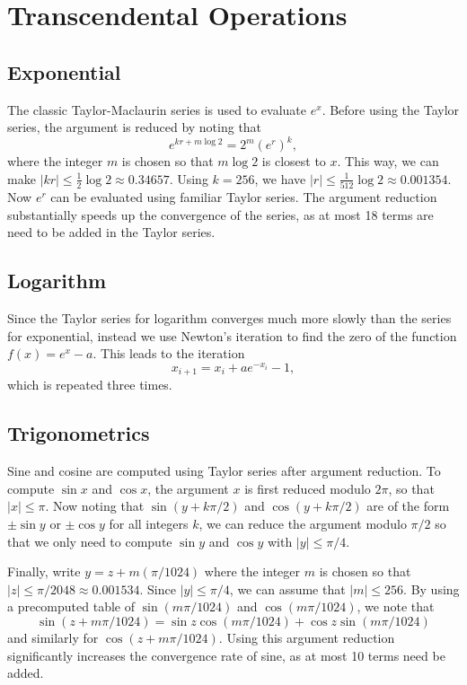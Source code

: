 \documentclass[11pt]{article}
\theoremstyle{definition}
\begin{document}
\section{Transcendental Operations} \label{sec:transcendental}
\subsection{Exponential}
The classic Taylor-Maclaurin series is used to evaluate $e^x$.  Before
using the Taylor series, the argument is reduced by noting that
\begin{displaymath}
  e^{kr + m \log 2} = 2^m (e^r)^k, 
\end{displaymath}
where the integer $m$ is chosen so that $m \log 2$ is closest to $x$.
This way, we can make $|kr| \le \frac{1}{2} \log 2 \approx 0.34657$.
Using $k = 256$, we have $|r| \le \frac{1}{512} \log 2 \approx 0.001354$.
Now $e^r$ can be evaluated using familiar Taylor series.  The argument
reduction substantially speeds up the convergence of the series, as
at most 18 terms are need to be added in the Taylor series.

\subsection{Logarithm}
Since the Taylor series for logarithm converges much more slowly than 
the series for exponential, instead we use Newton's iteration to
find the zero of the function $f(x) = e^x - a$.  This leads to 
the iteration
\begin{displaymath}
  x_{i+1} = x_i + ae^{-x_i} - 1, 
\end{displaymath}
which is repeated three times.

\subsection{Trigonometrics}
Sine and cosine are computed using Taylor series after argument reduction.
To compute $\sin x$ and $\cos x$, the argument $x$ is first reduced modulo
$2 \pi$, so that $|x| \le \pi$.  Now noting that $\sin (y + k \pi /2)$
and $\cos (y + k \pi / 2)$ are of the form $\pm \sin y$ or $\pm \cos y$
for all integers $k$, we can reduce the argument modulo $\pi/2$ so that
we only need to compute $\sin y$ and $\cos y$ with $|y| \le \pi / 4$.

Finally, write $y = z + m (\pi / 1024)$ where the integer $m$ is chosen
so that $|z| \le \pi / 2048 \approx 0.001534$.  Since $|y| \le \pi / 4$, 
we can assume that $|m| \le 256$.
By using a precomputed table
of $\sin (m \pi / 1024)$ and $\cos (m \pi / 1024)$, we note that
\begin{displaymath}
  \sin (z + m \pi / 1024) = \sin z \cos (m \pi / 1024) + 
  \cos z \sin (m \pi / 1024)
\end{displaymath}
and similarly for $\cos (z + m \pi / 1024)$.  Using this argument
reduction significantly increases the convergence rate of sine, 
as at most 10 terms need be added.
\end{document}
